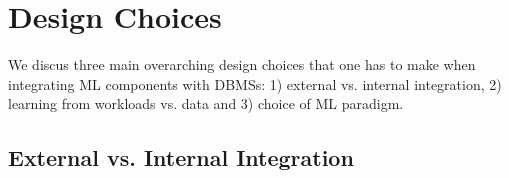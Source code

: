 \section{Design Choices}

We discus three main overarching design choices that one has to make when integrating ML components with DBMSs: 1) external vs. internal integration, 2)  learning from workloads vs. data and 3) choice of ML paradigm.


\subsection{External vs. Internal Integration}